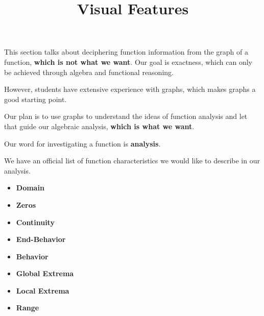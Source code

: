 \documentclass{ximera}
\title{Visual Features}
\begin{document}
\begin{abstract}
\end{abstract}
\maketitle






\begin{warning}


This section talks about deciphering function information from the graph of a function, \textbf{\textcolor{red!70!black}{which is not what we want}}.  Our goal is exactness, which can only be achieved through algebra and functional reasoning.

However, students have extensive experience with graphs, which makes graphs a good starting point. 

Our plan is to use graphs to understand the ideas of function analysis and let that guide our algebraic analysis, \textbf{\textcolor{red!70!black}{which is what we want}}.

\end{warning}





Our word for investigating a function is \textbf{\textcolor{blue!55!black}{analysis}}. 

We have an official list of function characteristics we would like to describe in our analysis. 






\begin{itemize}
\item \textbf{\textcolor{blue!55!black}{Domain}}
\item \textbf{\textcolor{blue!55!black}{Zeros}}
\item \textbf{\textcolor{blue!55!black}{Continuity}}
\item \textbf{\textcolor{blue!55!black}{End-Behavior}}
\item \textbf{\textcolor{blue!55!black}{Behavior}}
\item \textbf{\textcolor{blue!55!black}{Global Extrema}}
\item \textbf{\textcolor{blue!55!black}{Local Extrema}}
\item \textbf{\textcolor{blue!55!black}{Range}}
\end{itemize}
\end{document}
